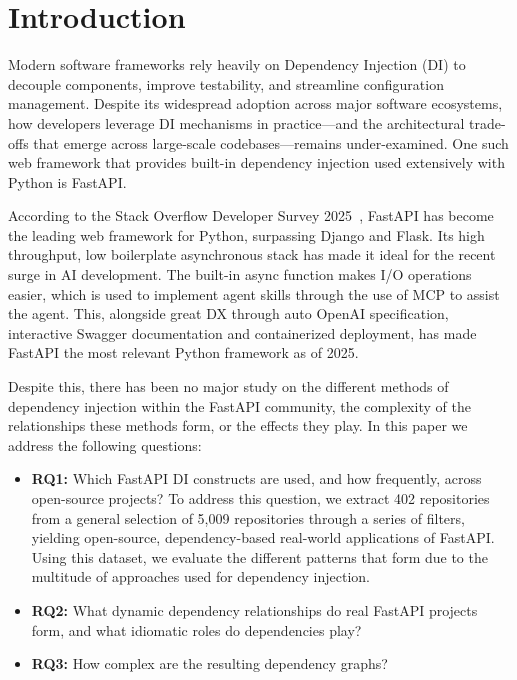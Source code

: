 \section{Introduction}

Modern software frameworks rely heavily on Dependency Injection (DI) to decouple components, improve testability, and streamline configuration management. Despite its widespread adoption across major software ecosystems, how developers leverage DI mechanisms in practice---and the architectural trade-offs that emerge across large-scale codebases---remains under-examined. One such web framework that provides built-in dependency injection used extensively with Python is FastAPI.

According to the Stack Overflow Developer Survey 2025~\cite{so2025}, FastAPI has become the leading web framework for Python, surpassing Django and Flask. Its high throughput, low boilerplate asynchronous stack has made it ideal for the recent surge in AI development. The built-in async function makes I/O operations easier, which is used to implement agent skills through the use of MCP to assist the agent. This, alongside great DX through auto OpenAI specification, interactive Swagger documentation and containerized deployment, has made FastAPI the most relevant Python framework as of 2025.

Despite this, there has been no major study on the different methods of dependency injection within the FastAPI community, the complexity of the relationships these methods form, or the effects they play. In this paper we address the following questions:

\begin{itemize}
    \item \textbf{RQ1:} Which FastAPI DI constructs are used, and how frequently, across open-source projects? To address this question, we extract 402 repositories from a general selection of 5,009 repositories through a series of filters, yielding open-source, dependency-based real-world applications of FastAPI. Using this dataset, we evaluate the different patterns that form due to the multitude of approaches used for dependency injection.
    \item \textbf{RQ2:} What dynamic dependency relationships do real FastAPI projects form, and what idiomatic roles do dependencies play?
    \item \textbf{RQ3:} How complex are the resulting dependency graphs?
\end{itemize}